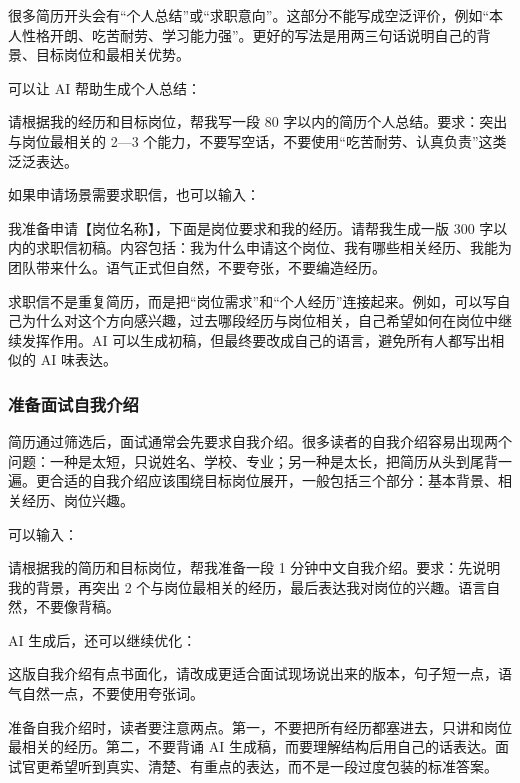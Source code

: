 很多简历开头会有“个人总结”或“求职意向”。这部分不能写成空泛评价，例如“本人性格开朗、吃苦耐劳、学习能力强”。更好的写法是用两三句话说明自己的背景、目标岗位和最相关优势。

可以让 AI 帮助生成个人总结：

\begin{tcolorbox}[promptbox]
请根据我的经历和目标岗位，帮我写一段 80 字以内的简历个人总结。要求：突出与岗位最相关的 2—3 个能力，不要写空话，不要使用“吃苦耐劳、认真负责”这类泛泛表达。
\end{tcolorbox}

如果申请场景需要求职信，也可以输入：

\begin{tcolorbox}[promptbox]
我准备申请【岗位名称】，下面是岗位要求和我的经历。请帮我生成一版 300 字以内的求职信初稿。内容包括：我为什么申请这个岗位、我有哪些相关经历、我能为团队带来什么。语气正式但自然，不要夸张，不要编造经历。
\end{tcolorbox}

求职信不是重复简历，而是把“岗位需求”和“个人经历”连接起来。例如，可以写自己为什么对这个方向感兴趣，过去哪段经历与岗位相关，自己希望如何在岗位中继续发挥作用。AI 可以生成初稿，但最终要改成自己的语言，避免所有人都写出相似的 AI 味表达。

\subsubsection*{准备面试自我介绍}

简历通过筛选后，面试通常会先要求自我介绍。很多读者的自我介绍容易出现两个问题：一种是太短，只说姓名、学校、专业；另一种是太长，把简历从头到尾背一遍。更合适的自我介绍应该围绕目标岗位展开，一般包括三个部分：基本背景、相关经历、岗位兴趣。

可以输入：

\begin{tcolorbox}[promptbox]
请根据我的简历和目标岗位，帮我准备一段 1 分钟中文自我介绍。要求：先说明我的背景，再突出 2 个与岗位最相关的经历，最后表达我对岗位的兴趣。语言自然，不要像背稿。
\end{tcolorbox}

AI 生成后，还可以继续优化：

\begin{tcolorbox}[promptbox]
这版自我介绍有点书面化，请改成更适合面试现场说出来的版本，句子短一点，语气自然一点，不要使用夸张词。
\end{tcolorbox}

准备自我介绍时，读者要注意两点。第一，不要把所有经历都塞进去，只讲和岗位最相关的经历。第二，不要背诵 AI 生成稿，而要理解结构后用自己的话表达。面试官更希望听到真实、清楚、有重点的表达，而不是一段过度包装的标准答案。

